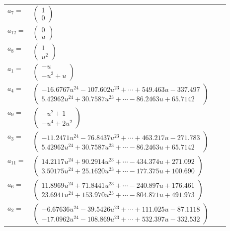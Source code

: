 \documentclass[1p]{elsarticle_modified}
\theoremstyle{definition}
\begin{document}
\begin{tabular}{m{7pt} m{180pt} m{7pt} m{180pt} }
\flushright $a_{7}=$&$\begin{pmatrix}1\\0\end{pmatrix}$ \\
\flushright $a_{12}=$&$\begin{pmatrix}0\\u\end{pmatrix}$ \\
\flushright $a_{8}=$&$\begin{pmatrix}1\\u^2\end{pmatrix}$ \\
\flushright $a_{1}=$&$\begin{pmatrix}- u\\- u^3+u\end{pmatrix}$ \\
\flushright $a_{4}=$&$\begin{pmatrix}-16.6767 u^{24}-107.602 u^{23}+\cdots+549.463 u-337.497\\5.42962 u^{24}+30.7587 u^{23}+\cdots-86.2463 u+65.7142\end{pmatrix}$ \\
\flushright $a_{9}=$&$\begin{pmatrix}- u^2+1\\- u^4+2 u^2\end{pmatrix}$ \\
\flushright $a_{3}=$&$\begin{pmatrix}-11.2471 u^{24}-76.8437 u^{23}+\cdots+463.217 u-271.783\\5.42962 u^{24}+30.7587 u^{23}+\cdots-86.2463 u+65.7142\end{pmatrix}$ \\
\flushright $a_{11}=$&$\begin{pmatrix}14.2117 u^{24}+90.2914 u^{23}+\cdots-434.374 u+271.092\\3.50175 u^{24}+25.1620 u^{23}+\cdots-177.375 u+100.690\end{pmatrix}$ \\
\flushright $a_{6}=$&$\begin{pmatrix}11.8969 u^{24}+71.8441 u^{23}+\cdots-240.897 u+176.461\\23.6941 u^{24}+153.970 u^{23}+\cdots-804.871 u+491.973\end{pmatrix}$ \\
\flushright $a_{2}=$&$\begin{pmatrix}-6.67636 u^{24}-39.5426 u^{23}+\cdots+111.025 u-87.1118\\-17.0962 u^{24}-108.869 u^{23}+\cdots+532.397 u-332.532\end{pmatrix}$ \\

\end{tabular}
\end{document}
